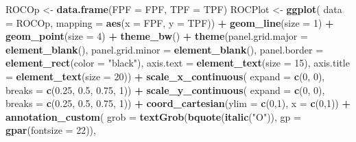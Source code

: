 \documentclass[
]{book}
\newenvironment{Shaded}{\begin{snugshade}}{\end{snugshade}}
\newcommand{\DataTypeTok}[1]{\textcolor[rgb]{0.13,0.29,0.53}{#1}}
\newcommand{\DecValTok}[1]{\textcolor[rgb]{0.00,0.00,0.81}{#1}}
\newcommand{\FloatTok}[1]{\textcolor[rgb]{0.00,0.00,0.81}{#1}}
\newcommand{\KeywordTok}[1]{\textcolor[rgb]{0.13,0.29,0.53}{\textbf{#1}}}
\newcommand{\NormalTok}[1]{#1}
\newcommand{\OperatorTok}[1]{\textcolor[rgb]{0.81,0.36,0.00}{\textbf{#1}}}
\newcommand{\StringTok}[1]{\textcolor[rgb]{0.31,0.60,0.02}{#1}}
\begin{document}
\begin{Shaded}
\begin{Highlighting}[]
\NormalTok{ROCOp \textless{}{-}}\StringTok{ }\KeywordTok{data.frame}\NormalTok{(}\DataTypeTok{FPF =}\NormalTok{ FPF, }\DataTypeTok{TPF =}\NormalTok{ TPF)}
\NormalTok{ROCPlot \textless{}{-}}\StringTok{ }\KeywordTok{ggplot}\NormalTok{(}
  \DataTypeTok{data =}\NormalTok{ ROCOp, }
  \DataTypeTok{mapping =} \KeywordTok{aes}\NormalTok{(}\DataTypeTok{x =}\NormalTok{ FPF, }\DataTypeTok{y =}\NormalTok{ TPF)) }\OperatorTok{+}\StringTok{ }
\StringTok{  }\KeywordTok{geom\_line}\NormalTok{(}\DataTypeTok{size =} \DecValTok{1}\NormalTok{) }\OperatorTok{+}\StringTok{ }
\StringTok{  }\KeywordTok{geom\_point}\NormalTok{(}\DataTypeTok{size =} \DecValTok{4}\NormalTok{) }\OperatorTok{+}\StringTok{ }
\StringTok{  }\KeywordTok{theme\_bw}\NormalTok{() }\OperatorTok{+}\StringTok{ }
\StringTok{  }\KeywordTok{theme}\NormalTok{(}\DataTypeTok{panel.grid.major =} \KeywordTok{element\_blank}\NormalTok{(), }
        \DataTypeTok{panel.grid.minor =} \KeywordTok{element\_blank}\NormalTok{(), }
        \DataTypeTok{panel.border =} \KeywordTok{element\_rect}\NormalTok{(}\DataTypeTok{color =} \StringTok{"black"}\NormalTok{), }
        \DataTypeTok{axis.text =} \KeywordTok{element\_text}\NormalTok{(}\DataTypeTok{size =} \DecValTok{15}\NormalTok{), }
        \DataTypeTok{axis.title =} \KeywordTok{element\_text}\NormalTok{(}\DataTypeTok{size =} \DecValTok{20}\NormalTok{)) }\OperatorTok{+}
\StringTok{  }\KeywordTok{scale\_x\_continuous}\NormalTok{(}
    \DataTypeTok{expand =} \KeywordTok{c}\NormalTok{(}\DecValTok{0}\NormalTok{, }\DecValTok{0}\NormalTok{), }
    \DataTypeTok{breaks =} \KeywordTok{c}\NormalTok{(}\FloatTok{0.25}\NormalTok{, }\FloatTok{0.5}\NormalTok{, }\FloatTok{0.75}\NormalTok{, }\DecValTok{1}\NormalTok{)) }\OperatorTok{+}\StringTok{ }
\StringTok{  }\KeywordTok{scale\_y\_continuous}\NormalTok{(}
    \DataTypeTok{expand =} \KeywordTok{c}\NormalTok{(}\DecValTok{0}\NormalTok{, }\DecValTok{0}\NormalTok{), }\DataTypeTok{breaks =} \KeywordTok{c}\NormalTok{(}\FloatTok{0.25}\NormalTok{, }\FloatTok{0.5}\NormalTok{, }\FloatTok{0.75}\NormalTok{, }\DecValTok{1}\NormalTok{)) }\OperatorTok{+}
\StringTok{  }\KeywordTok{coord\_cartesian}\NormalTok{(}\DataTypeTok{ylim =} \KeywordTok{c}\NormalTok{(}\DecValTok{0}\NormalTok{,}\DecValTok{1}\NormalTok{), }\DataTypeTok{x =} \KeywordTok{c}\NormalTok{(}\DecValTok{0}\NormalTok{,}\DecValTok{1}\NormalTok{)) }\OperatorTok{+}\StringTok{ }
\StringTok{  }\KeywordTok{annotation\_custom}\NormalTok{(}
    \DataTypeTok{grob =} \KeywordTok{textGrob}\NormalTok{(}\KeywordTok{bquote}\NormalTok{(}\KeywordTok{italic}\NormalTok{(}\StringTok{"O"}\NormalTok{)),}
                    \DataTypeTok{gp =} \KeywordTok{gpar}\NormalTok{(}\DataTypeTok{fontsize =} \DecValTok{22}\NormalTok{)), }

\end{Highlighting}
\end{Shaded}
\end{document}
